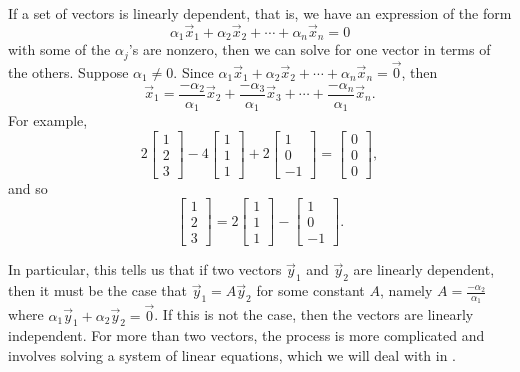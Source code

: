 \documentclass{ximera}
\begin{document}
If a set of vectors is linearly dependent, that is, we have an expression of the form
    \begin{equation*}
    \alpha_1\vec{x}_1 + \alpha_2\vec{x}_2 + \cdots + \alpha_n\vec{x}_n = 0
\end{equation*}
with some of the $\alpha_j$'s are nonzero, then we can solve for one vector in terms of the others. Suppose $\alpha_1 \not= 0$.  Since $\alpha_1 \vec{x}_1 +  \alpha_2 \vec{x}_2 + \cdots + \alpha_n \vec{x}_n = \vec{0}$, then
\begin{equation*}
    \vec{x}_1 = \frac{-\alpha_2}{\alpha_1}
    \vec{x}_2 + \frac{-\alpha_3}{\alpha_1}
    \vec{x}_3 + \cdots +
    \frac{-\alpha_n}{\alpha_1} 
    \vec{x}_n .
\end{equation*}
For example,
\begin{equation*}
    2
    \begin{bmatrix} 1 \\ 2 \\ 3 \end{bmatrix}
    -4
    \begin{bmatrix} 1 \\ 1 \\ 1 \end{bmatrix}
    +
    2 \begin{bmatrix} 1 \\ 0 \\ -1 \end{bmatrix}
    =
    \begin{bmatrix} 0 \\ 0 \\ 0 \end{bmatrix} ,
\end{equation*}
and so
\begin{equation*}
    \begin{bmatrix} 1 \\ 2 \\ 3 \end{bmatrix}
    = 2 \begin{bmatrix} 1 \\ 1 \\ 1 \end{bmatrix}
    - \begin{bmatrix} 1 \\ 0 \\ -1 \end{bmatrix} .
\end{equation*}

In particular, this tells us that if two vectors $\vec{y}_1$ and $\vec{y}_2$ are linearly dependent, then it must be the case that $\vec{y}_1 = A\vec{y}_2$ for some constant $A$, namely $A = \frac{-\alpha_2}{\alpha_1}$ where $\alpha_1\vec{y}_1 + \alpha_2\vec{y}_2 = \vec{0}$. If this is not the case, then the vectors are linearly independent. For more than two vectors, the process is more complicated and involves solving a system of linear equations, which we will deal with in .
\end{document}
